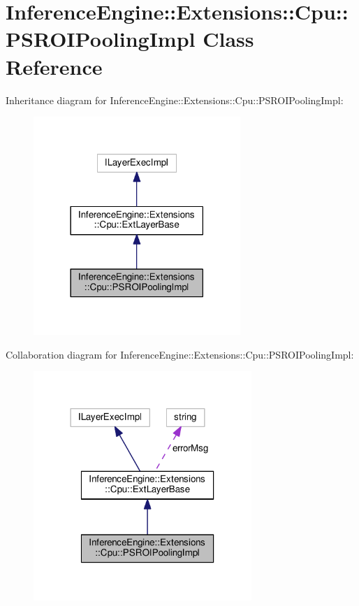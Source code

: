 \hypertarget{classInferenceEngine_1_1Extensions_1_1Cpu_1_1PSROIPoolingImpl}{}\section{Inference\+Engine\+:\+:Extensions\+:\+:Cpu\+:\+:P\+S\+R\+O\+I\+Pooling\+Impl Class Reference}
\label{classInferenceEngine_1_1Extensions_1_1Cpu_1_1PSROIPoolingImpl}


Inheritance diagram for Inference\+Engine\+:\+:Extensions\+:\+:Cpu\+:\+:P\+S\+R\+O\+I\+Pooling\+Impl\+:
\nopagebreak
\begin{figure}[H]
\begin{center}
\leavevmode
\includegraphics[width=222pt]{classInferenceEngine_1_1Extensions_1_1Cpu_1_1PSROIPoolingImpl__inherit__graph}
\end{center}
\end{figure}


Collaboration diagram for Inference\+Engine\+:\+:Extensions\+:\+:Cpu\+:\+:P\+S\+R\+O\+I\+Pooling\+Impl\+:
\nopagebreak
\begin{figure}[H]
\begin{center}
\leavevmode
\includegraphics[width=234pt]{classInferenceEngine_1_1Extensions_1_1Cpu_1_1PSROIPoolingImpl__coll__graph}
\end{center}
\end{figure}
